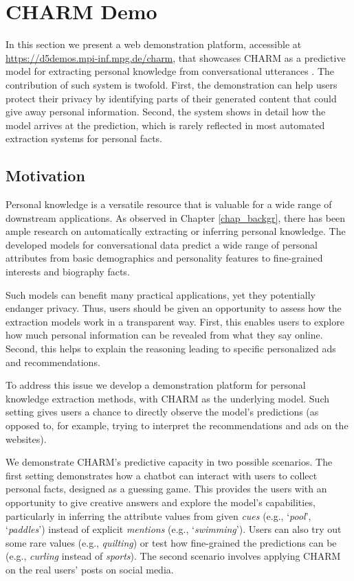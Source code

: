 \section{CHARM Demo}

In this section we present a web demonstration platform, accessible at \url{https://d5demos.mpi-inf.mpg.de/charm}, that showcases CHARM as a predictive model for extracting personal knowledge from conversational utterances \cite{tigunova2021exploring}. The contribution of such system is twofold. First, the demonstration can help users protect their privacy by identifying parts of their generated content that could give away personal information. Second, the system shows in detail how the model arrives at the prediction, which is rarely 
reflected in most automated extraction systems for personal facts.

\subsection{Motivation} 

Personal knowledge is a versatile resource that is valuable for a wide range of downstream applications. As observed in Chapter \ref{chap_backgr}, there has been ample research on automatically extracting or inferring personal knowledge. The developed models for conversational data predict a wide range of personal attributes from basic demographics and personality features to fine-grained interests and biography facts.

Such models can benefit many practical applications, yet they potentially endanger privacy. Thus, users should be given an opportunity to assess how the extraction models work in a transparent way. First, this enables users to explore how much personal information can be revealed from what they say online. Second, this helps to explain the reasoning leading to specific personalized ads and recommendations.

To address this issue we develop a demonstration platform for personal knowledge extraction methods, with CHARM as the underlying model. Such setting gives users a chance to directly observe the model's predictions (as opposed to, for example, trying to interpret the recommendations and ads on the websites).

We demonstrate CHARM's predictive capacity in two possible scenarios. The first setting demonstrates how a chatbot can interact with users to collect personal facts, designed as a guessing game. 
This provides the users with an opportunity to give creative answers and explore the model's capabilities, particularly in inferring the attribute values from given \emph{cues} (e.g., `\textit{pool}', `\textit{paddles}') instead of explicit \emph{mentions} (e.g., `\textit{swimming}'). 
Users can also try out some rare values (e.g., \emph{quilting}) or test how fine-grained the predictions can be (e.g., \emph{curling} instead of \emph{sports}). 
The second scenario involves applying CHARM on the real users' posts on social media. 


